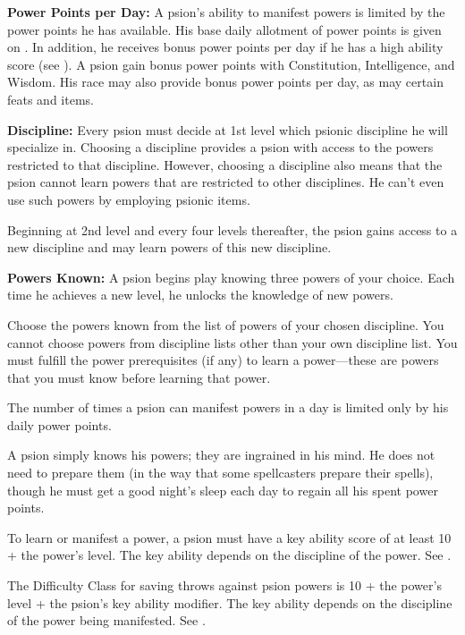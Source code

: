 \textbf{Power Points per Day:} A psion's ability to manifest powers is limited by the power points he has available. His base daily allotment of power points is given on . In addition, he receives bonus power points per day if he has a high ability score (see ). A psion gain bonus power points with Constitution, Intelligence, and Wisdom. His race may also provide bonus power points per day, as may certain feats and items.

\textbf{Discipline:} Every psion must decide at 1st level which psionic discipline he will specialize in. Choosing a discipline provides a psion with access to the powers restricted to that discipline. However, choosing a discipline also means that the psion cannot learn powers that are restricted to other disciplines. He can't even use such powers by employing psionic items.

Beginning at 2nd level and every four levels thereafter, the psion gains access to a new discipline and may learn powers of this new discipline.

\textbf{Powers Known:} A psion begins play knowing three powers of your choice. Each time he achieves a new level, he unlocks the knowledge of new powers.

Choose the powers known from the list of powers of your chosen discipline. You cannot choose powers from discipline lists other than your own discipline list. You must fulfill the power prerequisites (if any) to learn a power---these are powers that you must know before learning that power.

The number of times a psion can manifest powers in a day is limited only by his daily power points.

A psion simply knows his powers; they are ingrained in his mind. He does not need to prepare them (in the way that some spellcasters prepare their spells), though he must get a good night's sleep each day to regain all his spent power points.

To learn or manifest a power, a psion must have a key ability score of at least 10 + the power's level. The key ability depends on the discipline of the power. See .

The Difficulty Class for saving throws against psion powers is 10 + the power's level + the psion's key ability modifier. The key ability depends on the discipline of the power being manifested. See .


